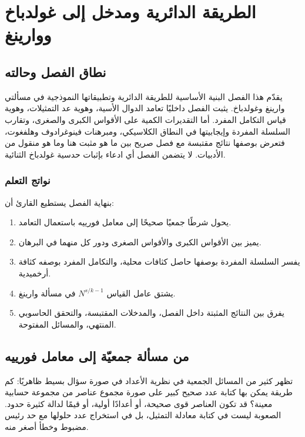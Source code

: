 \chapter{الطريقة الدائرية ومدخل إلى غولدباخ ووارينغ}
\label{ch:circle-method-goldbach-waring}

\section*{نطاق الفصل وحالته}

يقدّم هذا الفصل البنية الأساسية للطريقة الدائرية وتطبيقاتها النموذجية في مسألتي وارينغ وغولدباخ. يثبت الفصل داخليًا تعامد الدوال الأسية، وهوية عد التمثيلات، وهوية قياس التكامل المفرد. أما التقديرات الكمية على الأقواس الكبرى والصغرى، وتقارب السلسلة المفردة وإيجابيتها في النطاق الكلاسيكي، ومبرهنات فينوغرادوف وهلفغوت، فتعرض بوصفها نتائج مقتبسة مع فصل صريح بين ما هو مثبت هنا وما هو منقول من الأدبيات. لا يتضمن الفصل أي ادعاء بإثبات حدسية غولدباخ الثنائية.

\subsection*{نواتج التعلم}

بنهاية الفصل يستطيع القارئ أن:
\begin{enumerate}
\item يحول شرطًا جمعيًا صحيحًا إلى معامل فورييه باستعمال التعامد.
\item يميز بين الأقواس الكبرى والأقواس الصغرى ودور كل منهما في البرهان.
\item يفسر السلسلة المفردة بوصفها حاصل كثافات محلية، والتكامل المفرد بوصفه كثافة أرخميدية.
\item يشتق عامل القياس $N^{s/k-1}$ في مسألة وارينغ.
\item يفرق بين النتائج المثبتة داخل الفصل، والمدخلات المقتبسة، والتحقق الحاسوبي المنتهي، والمسائل المفتوحة.
\end{enumerate}

\section{من مسألة جمعيّة إلى معامل فورييه}

تظهر كثير من المسائل الجمعية في نظرية الأعداد في صورة سؤال بسيط ظاهريًا: كم طريقة يمكن بها كتابة عدد صحيح كبير على صورة مجموع عناصر من مجموعة حسابية معينة؟ قد تكون العناصر قوى صحيحة، أو أعدادًا أولية، أو قيمًا لدالة كثيرة حدود. الصعوبة ليست في كتابة معادلة التمثيل، بل في استخراج عدد حلولها مع حد رئيس مضبوط وخطأ أصغر منه.

